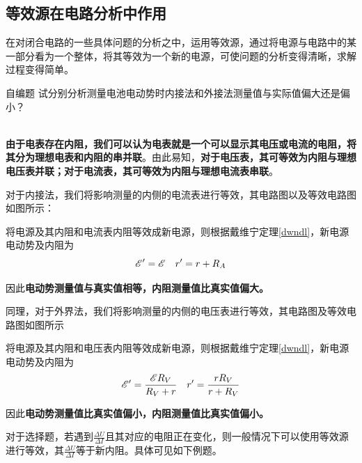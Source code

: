 \subsection{等效源在电路分析中作用}

在对闭合电路的一些具体问题的分析之中，运用等效源，通过将电源与电路中的某一部分看为一个整体，将其等效为一个新的电源，可使问题的分析变得清晰，求解过程变得简单。

\begin{ep}{自编题}{}
试分别分析测量电池电动势时内接法和外接法测量值与实际值偏大还是偏小？

~\\
\textbf{由于电表存在内阻，我们可以认为电表就是一个可以显示其电压或电流的电阻，将其分为理想电表和内阻的串并联}。由此易知，\textbf{对于电压表，其可等效为内阻与理想电压表并联；对于电流表，其可等效为内阻与理想电流表串联}。

对于内接法，我们将影响测量的内侧的电流表进行等效，其电路图以及等效电路图如图所示：



将电源及其内阻和电流表内阻等效成新电源，则根据戴维宁定理\eqref{dwndl}，新电源电动势及内阻为
$$ \mathscr{E}^{\prime} = \mathscr{E} \quad r^{\prime} = r + R_A $$

因此\textbf{电动势测量值与真实值相等，内阻测量值比真实值偏大。}

同理，对于外界法，我们将影响测量的内侧的电压表进行等效，其电路图及等效电路图如图所示



将电源及其内阻和电压表内阻等效成新电源，则根据戴维宁定理\eqref{dwndl}，新电源电动势及内阻为
$$ \mathscr{E}^{\prime} = \frac{ \mathscr{E} R_V}{R_V + r} \quad r^{\prime} = \frac{r R_V}{r + R_V} $$

因此\textbf{电动势测量值比真实值偏小，内阻测量值比真实值偏小。}
\end{ep}

对于选择题，若遇到$\frac{\Delta U}{\Delta I}$且其对应的电阻正在变化，则一般情况下可以使用等效源进行等效，其$\frac{\Delta U}{\Delta I}$等于新内阻。具体可见如下例题。

